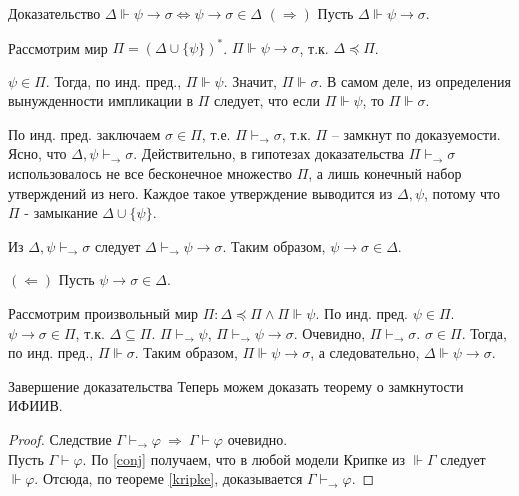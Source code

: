 \documentclass[aspectratio=169]{beamer}
\begin{document}
\begin{frame}{Доказательство $\Delta \Vdash \psi \rightarrow \sigma \Leftrightarrow \psi \rightarrow \sigma \in \Delta$}
				$(\Rightarrow)$ Пусть $\Delta \Vdash \psi \rightarrow \sigma$.
				
				Рассмотрим мир $\Pi = (\Delta \cup \{\psi\})^*$. $\Pi \Vdash \psi \rightarrow \sigma$, т.к. $\Delta \preccurlyeq \Pi$.
				
				$\psi \in \Pi$. Тогда, по инд. пред., $\Pi \Vdash \psi$. Значит, $\Pi \Vdash \sigma$. В самом деле, из определения вынужденности импликации в $\Pi$ следует, что если $\Pi \Vdash \psi$, то $\Pi \Vdash \sigma$.
				
				По инд. пред. заключаем $\sigma \in \Pi$, т.е. $\Pi \vdash_\rightarrow \sigma$, т.к. $\Pi$ -- замкнут по доказуемости. Ясно, что $\Delta, \psi \vdash_\rightarrow \sigma$. Действительно, в гипотезах доказательства $\Pi \vdash_\rightarrow \sigma$ использовалось не все бесконечное множество $\Pi$, а лишь конечный набор утверждений из него. Каждое такое утверждение выводится из $\Delta, \psi$, потому что $\Pi$ - замыкание $\Delta \cup \{\psi\}$. 
				
				Из $\Delta, \psi \vdash_\rightarrow \sigma$ следует $\Delta \vdash_\rightarrow \psi \rightarrow \sigma$. Таким образом, $\psi \rightarrow \sigma \in \Delta$.

				$(\Leftarrow)$ Пусть $\psi \rightarrow \sigma \in \Delta$.
				
				Рассмотрим произвольный мир $\Pi: \Delta \preccurlyeq \Pi \land \Pi \Vdash \psi$. По инд. пред. $\psi \in \Pi$. $\psi \rightarrow \sigma \in \Pi$, т.к. $\Delta \subseteq \Pi$. $\Pi \vdash_\rightarrow \psi$, $\Pi \vdash_\rightarrow \psi \rightarrow \sigma$. Очевидно, $\Pi \vdash_\rightarrow \sigma$. $\sigma \in \Pi$. Тогда, по инд. пред., $\Pi \Vdash \sigma$. Таким образом, $\Pi \Vdash \psi \rightarrow \sigma$, а следовательно, $\Delta \Vdash \psi \rightarrow \sigma$.
\end{frame}

\begin{frame}{Завершение доказательства}
Теперь можем доказать теорему о замкнутости ИФИИВ.
\begin{proof}
	Следствие $\Gamma \vdash_\rightarrow \varphi \ \Rightarrow \ \Gamma \vdash \varphi$ очевидно.\\
	Пусть $\Gamma \vdash \varphi$. По \ref{conj} получаем, что в любой модели Крипке из $\Vdash \Gamma$ следует $\Vdash \varphi$. Отсюда, по теореме \ref{kripke}, доказывается $\Gamma \vdash_\rightarrow \varphi$.
\end{proof}
\end{frame}
\end{document}
